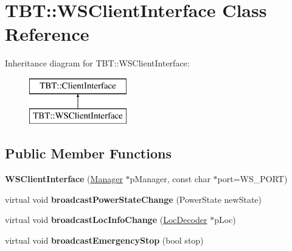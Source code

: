 \hypertarget{classTBT_1_1WSClientInterface}{}\section{T\+BT\+:\+:W\+S\+Client\+Interface Class Reference}
\label{classTBT_1_1WSClientInterface}
Inheritance diagram for T\+BT\+:\+:W\+S\+Client\+Interface\+:\begin{figure}[H]
\begin{center}
\leavevmode
\includegraphics[height=2.000000cm]{classTBT_1_1WSClientInterface}
\end{center}
\end{figure}
\subsection*{Public Member Functions}
\begin{DoxyCompactItemize}
\item 
\mbox{\label{classTBT_1_1WSClientInterface_addd44890c3c54a9700a2385a63105e38}} 
{\bfseries W\+S\+Client\+Interface} (\hyperlink{classTBT_1_1Manager}{Manager} $\ast$p\+Manager, const char $\ast$port=W\+S\+\_\+\+P\+O\+RT)
\item 
\mbox{\label{classTBT_1_1WSClientInterface_ad5ff4048859e3bf2fe8c62b9b2c59080}} 
virtual void {\bfseries broadcast\+Power\+State\+Change} (Power\+State new\+State)
\item 
\mbox{\label{classTBT_1_1WSClientInterface_a39806206461815c06c517b66d122b4db}} 
virtual void {\bfseries broadcast\+Loc\+Info\+Change} (\hyperlink{classTBT_1_1LocDecoder}{Loc\+Decoder} $\ast$p\+Loc)
\item 
\mbox{\label{classTBT_1_1WSClientInterface_a328ee22796e058e0da825e5f13349e1f}} 
virtual void {\bfseries broadcast\+Emergency\+Stop} (bool stop)
\end{DoxyCompactItemize}
